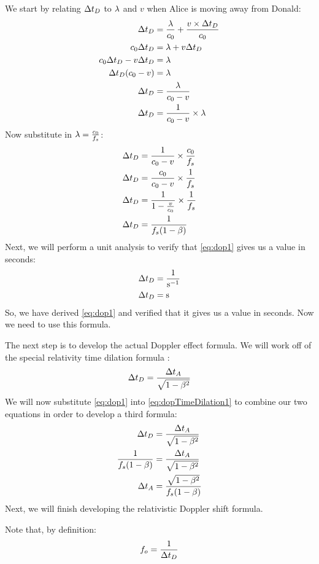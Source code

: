 		We start by relating $\mathrm{\Delta} t_D$ to $\mathrm{\lambda}$ and $v$ when Alice is moving away from Donald:
		\begin{align*}
			\Del t_D &= \frac{\lam}{\si{\clight}} + \frac{v \times \Del t_D}{\si{\clight}}\\
			\si{\clight} \Del t_D &= \lam + v\Del t_D\\
			\si{\clight} \Del t_D - v\Delta t_D &= \lam\\
			\Del t_D (\si{\clight} - v) &= \lam\\
			\Del t_D &= \frac{\lam}{\si{\clight} - v}\\
			\Del t_D &= \frac{1}{\si{\clight} - v} \times \lam
		\end{align*}
		Now substitute in $\lam = \frac{\si{\clight}}{f_s}$:
		\begin{align}
			\Del t_D &= \frac{1}{\si{\clight} - v} \times \frac{\si{\clight}}{f_s}\nonumber\\
			\Del t_D &= \frac{\si{\clight}}{\si{\clight} - v} \times \frac{1}{f_s}\nonumber\\
			\Del t_D &= \frac{1}{1 - \frac{v}{\si{\clight}}} \times \frac{1}{f_s}\nonumber\\
			\Del t_D &= \frac{1}{f_s(1 - \beta)}\label{eq:dop1}
		\end{align}
		Next, we will perform a unit analysis to verify that \eqref{eq:dop1} gives us a value in seconds:
		\begin{align*}
			\mathrm{\Delta} t_D &= \frac{1}{\si{\per\second}}\\
			\mathrm{\Delta} t_D &= \si{\second}
		\end{align*}
		So, we have derived \eqref{eq:dop1} and verified that it gives us a value in seconds.
		Now we need to use this formula.

		The next step is to develop the actual Doppler effect formula.
		We will work off of the special relativity time dilation formula \autocite[\pno~593]{textbook}:
		\begin{equation}\label{eq:dopTimeDilation1}
			\mathrm{\Delta} t_D = \frac{\mathrm{\Delta} t_A}{\sqrt{1 - \beta^2}}
		\end{equation}
		We will now substitute \eqref{eq:dop1} into \eqref{eq:dopTimeDilation1} to combine our two equations in order to develop a third formula:
		\begin{align}
			\mathrm{\Delta} t_D &= \frac{\mathrm{\Delta} t_A}{\sqrt{1 - \beta^2}}\nonumber\\
			\frac{1}{f_s(1 - \beta)} &= \frac{\mathrm{\Delta} t_A}{\sqrt{1 - \beta^2}}\nonumber\\
			\mathrm{\Delta} t_A &= \frac{\sqrt{1 - \beta^2}}{f_s(1 - \beta)}\label{eq:dopTimeDilation2}
		\end{align}
		Next, we will finish developing the relativistic Doppler shift formula.

		Note that, by definition:
		\begin{equation}\label{eq:dop2}
			f_o = \frac{1}{\mathrm{\Delta} t_D}
		\end{equation}
